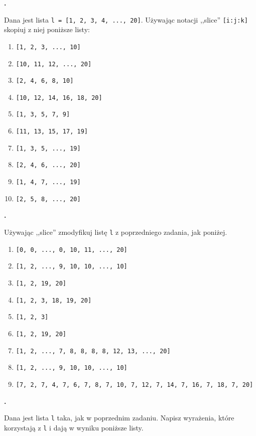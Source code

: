 \documentclass[a4paper]{article}
\begin{document}
\textbf{.}\addtocounter{zadanie}{1} Dana jest lista \verb|l = [1, 2, 3, 4, ..., 20]|. Używając notacji ,,slice'' \verb|[i:j:k]| skopiuj z niej poniższe listy:

\begin{multicols}{2}
\begin{enumerate}[label=\arabic*.]
    \item \verb|[1, 2, 3, ..., 10]|
    \item \verb|[10, 11, 12, ..., 20]|
    \item \verb|[2, 4, 6, 8, 10]|
    \item \verb|[10, 12, 14, 16, 18, 20]|
    \item \verb|[1, 3, 5, 7, 9]|
    \item \verb|[11, 13, 15, 17, 19]|
    \item \verb|[1, 3, 5, ..., 19]|
    \item \verb|[2, 4, 6, ..., 20]|
    \item \verb|[1, 4, 7, ..., 19]|
    \item \verb|[2, 5, 8, ..., 20]|
\end{enumerate}

\end{multicols}


\textbf{.}\addtocounter{zadanie}{1} Używając ,,slice'' zmodyfikuj listę \verb|l| z poprzedniego zadania, jak poniżej.

\begin{enumerate}[label=\arabic*.]
    \item \verb|[0, 0, ..., 0, 10, 11, ..., 20]|
    \item \verb|[1, 2, ..., 9, 10, 10, ..., 10]|
    \item \verb|[1, 2, 19, 20]|
    \item \verb|[1, 2, 3, 18, 19, 20]|
    \item \verb|[1, 2, 3]|
    \item \verb|[1, 2, 19, 20]|
    \item \verb|[1, 2, ..., 7, 8, 8, 8, 8, 12, 13, ..., 20]|
    \item \verb|[1, 2, ..., 9, 10, 10, ..., 10]|
    \item \verb|[7, 2, 7, 4, 7, 6, 7, 8, 7, 10, 7, 12, 7, 14, 7, 16, 7, 18, 7, 20]|

\end{enumerate}

\textbf{.}\addtocounter{zadanie}{1} Dana jest lista \verb|l| taka, jak w poprzednim zadaniu. Napisz wyrażenia, które korzystają z \verb|l| i dają w wyniku poniższe listy.
\end{document}
